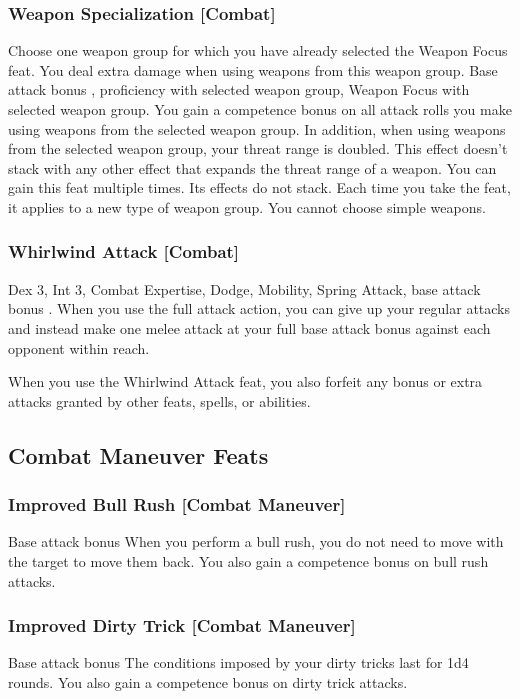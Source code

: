 \subsubsection{Weapon Specialization [Combat]}
Choose one weapon group for which you have already selected the Weapon Focus feat. You deal extra damage when using weapons from this weapon group.
 Base attack bonus , proficiency with selected weapon group, Weapon Focus with selected weapon group.
 You gain a  competence bonus on all attack rolls you make using weapons from the selected weapon group. In addition, when using weapons from the selected weapon group, your threat range is doubled. This effect doesn't stack with any other effect that expands the threat range of a weapon.
 You can gain this feat multiple times. Its effects do not stack. Each time you take the feat, it applies to a new type of weapon group. You cannot choose simple weapons.

\subsubsection{Whirlwind Attack [Combat]}
 Dex 3, Int 3, Combat Expertise, Dodge, Mobility, Spring Attack, base attack bonus .
 When you use the full attack action, you can give up your regular attacks and instead make one melee attack at your full base attack bonus against each opponent within reach.
\par When you use the Whirlwind Attack feat, you also forfeit any bonus or extra attacks granted by other feats, spells, or abilities.

\subsection{Combat Maneuver Feats}

\subsubsection{Improved Bull Rush [Combat Maneuver]}
 Base attack bonus 
 When you perform a bull rush, you do not need to move with the target to move them back. You also gain a  competence bonus on bull rush attacks.

\subsubsection{Improved Dirty Trick [Combat Maneuver]}
 Base attack bonus 
 The conditions imposed by your dirty tricks last for 1d4 rounds. You also gain a  competence bonus on dirty trick attacks.

